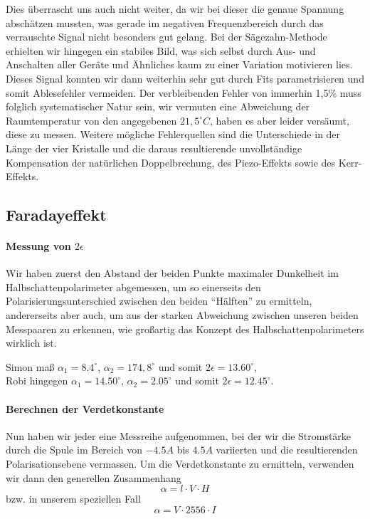 Dies überrascht uns auch nicht weiter, da wir bei dieser die genaue Spannung abschätzen mussten, was gerade im negativen Frequenzbereich durch das verrauschte Signal nicht besonders gut gelang. Bei der Sägezahn-Methode erhielten wir hingegen ein stabiles Bild, was sich selbst durch Aus- und Anschalten aller Geräte und Ähnliches kaum zu einer Variation motivieren lies. Dieses Signal konnten wir dann weiterhin sehr gut durch Fits parametrisieren und somit Ablesefehler vermeiden. Der verbleibenden Fehler von immerhin 1,5\% muss folglich systematischer Natur sein, wir vermuten eine Abweichung der Raumtemperatur von den angegebenen $21,5^\circ C$, haben es aber leider versäumt, diese zu messen. Weitere mögliche Fehlerquellen sind die Unterschiede in der Länge der vier Kristalle und die daraus resultierende unvollständige Kompensation der natürlichen Doppelbrechung, des Piezo-Effekts sowie des Kerr-Effekts.


\subsection{Faradayeffekt}

\paragraph{Messung von $2\epsilon$}
Wir haben zuerst den Abstand der beiden Punkte maximaler Dunkelheit im Halbschattenpolarimeter abgemessen, um so einerseits den Polarisierungsunterschied zwischen den beiden "`Hälften"' zu ermitteln, andererseits aber auch, um aus der starken Abweichung zwischen unseren beiden Messpaaren zu erkennen, wie großartig das Konzept des Halbschattenpolarimeters wirklich ist.

Simon maß $\alpha_1 = 8.4^\circ$, $\alpha_2 = 174,8^\circ$ und somit $ 2\epsilon = 13.60^\circ $,\\ Robi hingegen $\alpha_1 = 14.50^\circ$, $\alpha_2 = 2.05^\circ$ und somit $ 2\epsilon = 12.45^\circ $.


\paragraph{Berechnen der Verdetkonstante}

Nun haben wir jeder eine Messreihe aufgenommen, bei der wir die Stromstärke durch die Spule im Bereich von $-4.5 A$ bis $4.5 A$ variierten und die resultierenden Polarisationsebene vermassen. Um die Verdetkonstante zu ermitteln, verwenden wir dann den generellen Zusammenhang
$$ \alpha = l \cdot V \cdot H $$
bzw. in unserem speziellen Fall
$$ \alpha = V \cdot 2556 \cdot I $$
  
